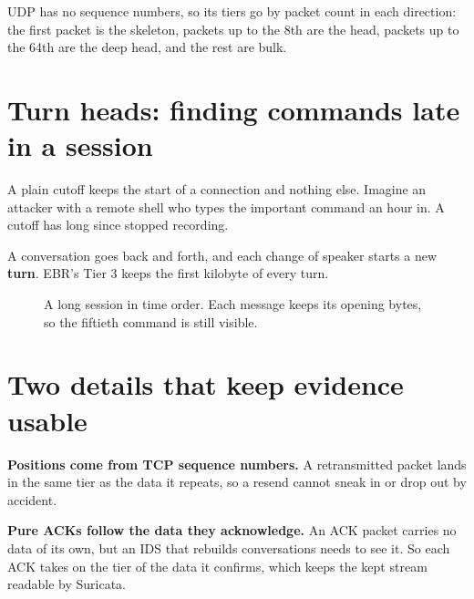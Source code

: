UDP has no sequence numbers, so its tiers go by packet count in each direction: the first packet is the skeleton, packets up to the 8th are the head, packets up to the 64th are the deep head, and the rest are bulk.

\section{Turn heads: finding commands late in a session}
A plain cutoff keeps the start of a connection and nothing else. Imagine an attacker with a remote shell who types the important command an hour in. A cutoff has long since stopped recording.

A conversation goes back and forth, and each change of speaker starts a new \textbf{turn}. EBR's Tier 3 keeps the first kilobyte of every turn.

\begin{figure}[H]
\centering
{}
\caption{A long session in time order. Each message keeps its opening bytes, so the fiftieth command is still visible.}
\end{figure}

\section{Two details that keep evidence usable}
\textbf{Positions come from TCP sequence numbers.} A retransmitted packet lands in the same tier as the data it repeats, so a resend cannot sneak in or drop out by accident.

\textbf{Pure ACKs follow the data they acknowledge.} An ACK packet carries no data of its own, but an IDS that rebuilds conversations needs to see it. So each ACK takes on the tier of the data it confirms, which keeps the kept stream readable by Suricata.

